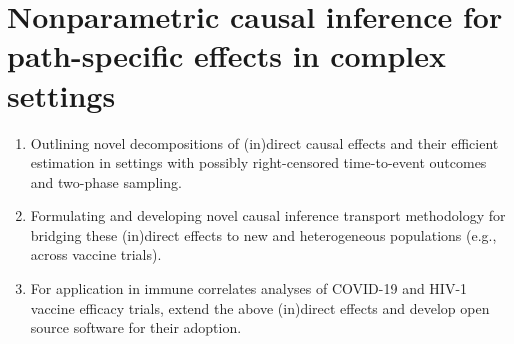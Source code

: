 \section{Nonparametric causal inference for path-specific effects in complex
  settings}

\begin{enumerate}[label=(\alph*)]
  \itemsep0.2pt
  \item Outlining novel decompositions of (in)direct causal effects and their
    efficient estimation in settings with possibly right-censored time-to-event
    outcomes and two-phase sampling.
  \item Formulating and developing novel causal inference transport methodology
    for bridging these (in)direct effects to new and heterogeneous populations
    (e.g., across vaccine trials).
  \item For application in immune correlates analyses of COVID-19 and HIV-1
     vaccine efficacy trials, extend the above (in)direct effects and develop
     open source software for their adoption.
\end{enumerate}

